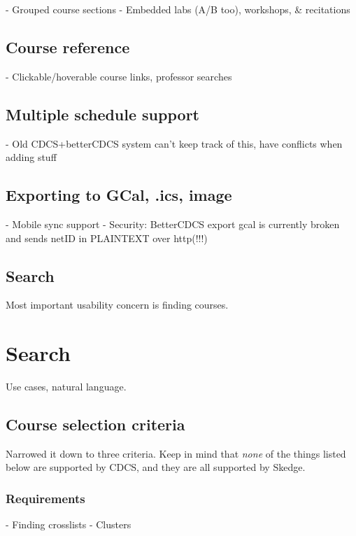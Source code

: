 - Grouped course sections
- Embedded labs (A/B too), workshops, \& recitations

\subsection{Course reference}

- Clickable/hoverable course links, professor searches

\subsection{Multiple schedule support}

- Old CDCS+betterCDCS system can't keep track of this, have conflicts when adding stuff

\subsection{Exporting to GCal, .ics, image}

- Mobile sync support
- Security: BetterCDCS export gcal is currently broken and sends netID in PLAINTEXT over http(!!!)

\subsection{Search}

Most important usability concern is finding courses.


\section{Search}

Use cases, natural language.

\subsection{Course selection criteria}

Narrowed it down to three criteria. Keep in mind that \emph{none} of the things listed below are supported by CDCS, and they are all supported by Skedge.

  \subsubsection{Requirements}

  - Finding crosslists
  - Clusters


